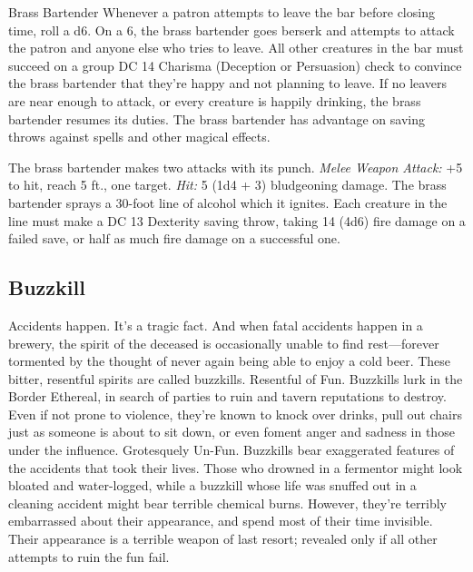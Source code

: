 \documentclass[10pt,a4paper,twoside,twocolumn,openany,bg=print,nodeprecatedcode]{dndbook}
\begin{document}
\begin{DndMonster}[float*=t]{Brass Bartender}
\DndMonsterBasics[
armor-class = {13},
hit-points = {\DndDice{4d8}},
speed = {30 ft.}
]
\DndMonsterAbilityScores[
 str = 10,
 dex = 16,
 con = 11,
 int = 8,
 wis = 14,
 cha = 8
]
\DndMonsterDetails[
skills = {Insight +4, Perception +4},
damage-immunities = {poison; bludgeoning, piercing, slashing from nonmagical attacks that aren't adamantine},
senses = {darkvision 60 ft., passive perception 14},
languages = {understands one language of its creator but can't speak},
challenge = 1,
]
Whenever a patron attempts to leave the bar before closing time, roll a d6. On a 6, the brass bartender goes berserk and attempts to attack the patron and anyone else who tries to leave. All other creatures in the bar must succeed on a group DC 14 Charisma (Deception or Persuasion) check to convince the brass bartender that they're happy and not planning to leave. If no leavers are near enough to attack, or every creature is happily drinking, the brass bartender resumes its duties.
The brass bartender has advantage on saving throws against spells and other magical effects.
\par
{}
The brass bartender makes two attacks with its punch.
\textsl{Melee Weapon Attack:} +5 to hit, reach 5 ft., one target. \textsl{Hit:} 5 (1d4 + 3) bludgeoning damage.
The brass bartender sprays a 30-foot line of alcohol which it ignites. Each creature in the line must make a DC 13 Dexterity saving throw, taking 14 (4d6) fire damage on a failed save, or half as much fire damage on a successful one.
\end{DndMonster}


\subsection{Buzzkill}
Accidents happen. It's a tragic fact. And when fatal accidents happen in a brewery, the spirit of the deceased is occasionally unable to find rest—forever tormented by the thought of never again being able to enjoy a cold beer. These bitter, resentful spirits are called buzzkills.
Resentful of Fun. Buzzkills lurk in the Border Ethereal, in search of parties to ruin and tavern reputations to destroy. Even if not prone to violence, they're known to knock over drinks, pull out chairs just as someone is about to sit down, or even foment anger and sadness in those under the influence.
Grotesquely Un-Fun. Buzzkills bear exaggerated features of the accidents that took their lives. Those who drowned in a fermentor might look bloated and water-logged, while a buzzkill whose life was snuffed out in a cleaning accident might bear terrible chemical burns. However, they're terribly embarrassed about their appearance, and spend most of their time invisible. Their appearance is a terrible weapon of last resort; revealed only if all other attempts to ruin the fun fail.
\end{document}
